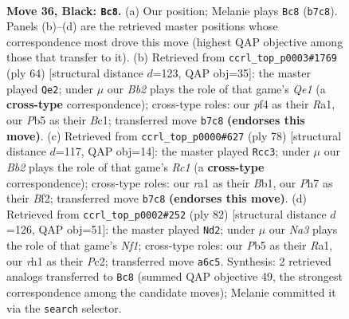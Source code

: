 \documentclass[11pt]{article}
\begin{document}
\clearpage

\begin{figure}[p]\centering
\begin{subfigure}{0.46\textwidth}\centering
\resizebox{\linewidth}{!}{%
\newchessgame
\chessboard[
  setfen={3r3r/pb3k1p/n1q3pP/1p1p1pP1/1b1P1P2/1P2P3/4NK2/R2Q1BNR b - - 19 36},
  showmover=false,
  pgfstyle=straightmove, color=movearrow, markmove={b7-c8}
]}
\caption{}
\end{subfigure}\hfill
\begin{subfigure}{0.46\textwidth}\centering
\resizebox{\linewidth}{!}{%
\newchessgame
\chessboard[
  setfen={3n1r2/2q3nk/1pb1p1rp/p2p2p1/P1pP2B1/2P1R2P/2P2PPN/R1B1Q1K1 w - - 2 33},
  showmover=false,
  pgfstyle=straightmove, color=movearrow, markmove={e1-e2}
]}
\caption{}
\end{subfigure}
\\[4pt]
\begin{subfigure}{0.46\textwidth}\centering
\resizebox{\linewidth}{!}{%
\newchessgame
\chessboard[
  setfen={r2b2r1/3q1pnk/Np2p1p1/1P1pPn2/3P1P1p/1R5P/5BPK/1BR1Q3 w - - 15 40},
  showmover=false,
  pgfstyle=straightmove, color=movearrow, markmove={c1-c3}
]}
\caption{}
\end{subfigure}\hfill
\begin{subfigure}{0.46\textwidth}\centering
\resizebox{\linewidth}{!}{%
\newchessgame
\chessboard[
  setfen={2nq1r2/3b3r/kp2p2p/pn1p3P/2pP2P1/P1P1Q1BB/2P3R1/R4N1K w - - 5 42},
  showmover=false,
  pgfstyle=straightmove, color=movearrow, markmove={f1-d2}
]}
\caption{}
\end{subfigure}
\caption{\textbf{Move 36, Black: \texttt{Bc8}.} (a) Our position; Melanie plays \texttt{Bc8} (\texttt{b7c8}). Panels (b)--(d) are the retrieved master positions whose correspondence most drove this move (highest QAP objective among those that transfer to it). (b) Retrieved from \texttt{ccrl\_top\_p0003\#1769} (ply 64) [structural distance $d$=123, QAP obj=35]: the master played \texttt{Qe2}; under $\mu$ our \emph{Bb2} plays the role of that game's \emph{Qe1} (a \textbf{cross-type} correspondence); cross-type roles: our \emph{p}f4 as their \emph{R}a1, our \emph{P}b5 as their \emph{B}c1; transferred move \texttt{b7c8} \textbf{(endorses this move)}. (c) Retrieved from \texttt{ccrl\_top\_p0000\#627} (ply 78) [structural distance $d$=117, QAP obj=14]: the master played \texttt{Rcc3}; under $\mu$ our \emph{Bb2} plays the role of that game's \emph{Rc1} (a \textbf{cross-type} correspondence); cross-type roles: our \emph{r}a1 as their \emph{B}b1, our \emph{P}h7 as their \emph{B}f2; transferred move \texttt{b7c8} \textbf{(endorses this move)}. (d) Retrieved from \texttt{ccrl\_top\_p0002\#252} (ply 82) [structural distance $d$=126, QAP obj=51]: the master played \texttt{Nd2}; under $\mu$ our \emph{Na3} plays the role of that game's \emph{Nf1}; cross-type roles: our \emph{P}b5 as their \emph{R}a1, our \emph{r}h1 as their \emph{P}c2; transferred move \texttt{a6c5}. Synthesis: 2 retrieved analogs transferred to \texttt{Bc8} (summed QAP objective 49, the strongest correspondence among the candidate moves); Melanie committed it via the \texttt{search} selector.}
\label{fig:thought-m71}
\end{figure}
\end{document}
